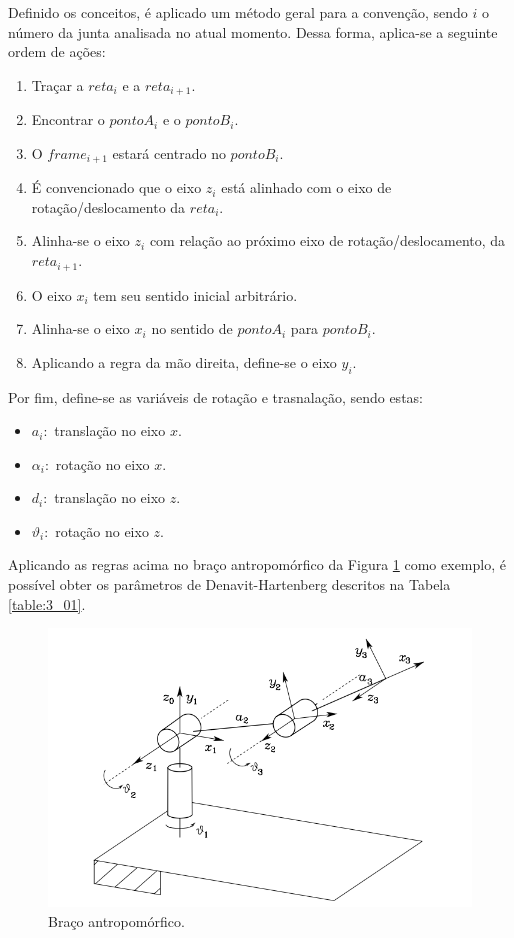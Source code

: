 Definido os conceitos, é aplicado um método geral para a convenção, sendo $i$ o número da junta analisada no atual momento. Dessa forma, aplica-se a seguinte ordem de ações:

\begin{enumerate}
\item Traçar a $reta_i$ e a $reta_{i+1}$.
\item Encontrar o $pontoA_i$ e o $pontoB_i$.
\item O $frame_{i+1}$ estará centrado no $pontoB_i$.
\item É convencionado que o eixo $z_i$ está alinhado com o eixo de rotação/deslocamento da $reta_i$.
\item Alinha-se o eixo $z_i$ com relação ao próximo eixo de rotação/deslocamento, da $reta_{i+1}$.
\item O eixo $x_i$ tem seu sentido inicial arbitrário.
\item Alinha-se o eixo $x_i$ no sentido de $pontoA_i$ para $pontoB_i$.
\item Aplicando a regra da mão direita, define-se o eixo $y_i$.
\end{enumerate}

Por fim, define-se as variáveis de rotação e trasnalação, sendo estas:

\begin{itemize}
\item $a_i:$ translação no eixo $x$.
\item $\alpha_i:$ rotação no eixo $x$. 
\item $d_i:$ translação no eixo $z$.
\item $\vartheta_i:$ rotação no eixo $z$. 
\end{itemize}

Aplicando as regras acima no braço antropomórfico da Figura \ref{fig:BracoAntro} como exemplo, é possível obter os parâmetros de Denavit-Hartenberg descritos na Tabela \ref{table:3_01}.

\begin{figure}[b!]
\centering
\includegraphics[width=0.7\columnwidth]{Imagens/BracoAntropo.PNG}
\caption{Braço antropomórfico.\cite{siciliano2010robotics}}
\label{fig:BracoAntro}
\end{figure}

